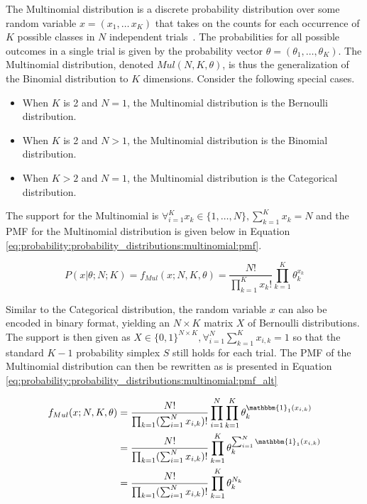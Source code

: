 The Multinomial distribution is a discrete probability distribution over some random variable $x = (x_{1}, \dots\, x_{K})$ that takes on the counts for each occurrence of $K$ possible classes in $N$ independent trials~\cite{ref:wackerly:2014}. The probabilities for all possible outcomes in a single trial is given by the probability vector $\theta = (\theta_{1}, \dots, \theta_{K})$. The Multinomial distribution, denoted $Mul(N, K, \theta)$, is thus the generalization of the Binomial distribution to $K$ dimensions. Consider the following special cases.

\begin{itemize}
      \item When $K$ is 2 and $N = 1$, the Multinomial distribution is the Bernoulli distribution.
      \item When $K$ is 2 and $N > 1$, the Multinomial distribution is the Binomial distribution.
      \item When $K > 2$ and $N = 1$, the Multinomial distribution is the Categorical distribution.
\end{itemize}

The support for the Multinomial is $\forall_{i=1}^{K} x_{k} \in \{1, \dots, N\}, \sum_{k=1}^{K}x_{k} = N$ and the \ac{PMF} for the Multinomial distribution is given below in Equation \ref{eq:probability:probability_distributions:multinomial:pmf}.

\begin{equation}
      \label{eq:probability:probability_distributions:multinomial:pmf}
      P(x \vert \theta; N; K) = f_{Mul}(x; N, K, \theta) = \frac{N!}{\prod_{k=1}^{K}x_{k}!} \prod_{k=1}^{K}\theta_{k}^{x_{k}}
\end{equation}

Similar to the Categorical distribution, the random variable $x$ can also be encoded in binary format, yielding an $N \times K$ matrix $X$ of Bernoulli distributions. The support is then given as $X \in \{0, 1\}^{N \times K}, \forall_{i=1}^{N}\sum_{k=1}^{K} x_{i,k} = 1$ so that the standard $K-1$ probability simplex $S$ still holds for each trial. The \ac{PMF} of the Multinomial distribution can then be rewritten as is presented in Equation \ref{eq:probability:probability_distributions:multinomial:pmf_alt}

\begin{equation}
      \label{eq:probability:probability_distributions:multinomial:pmf_alt}
      \begin{split}
            f_{Mul}(x; N, K, \theta) &= \frac{N!}{\prod_{k=1}(\sum_{i=1}^{N}x_{i, k})!}\prod_{i=1}^{N}\prod_{k=1}^{K}\theta_{k}^{\mathbbm{1}_{1}(x_{i,k})} \\
            &= \frac{N!}{\prod_{k=1}(\sum_{i=1}^{N}x_{i, k})!} \prod_{k=1}^{K}\theta_{k}^{\sum_{i=1}^{N}\mathbbm{1}_{1}(x_{i,k})} \\
            &= \frac{N!}{\prod_{k=1}(\sum_{i=1}^{N}x_{i, k})!} \prod_{k=1}^{K}\theta_{k}^{N_{k}} \\
      \end{split}
\end{equation}

